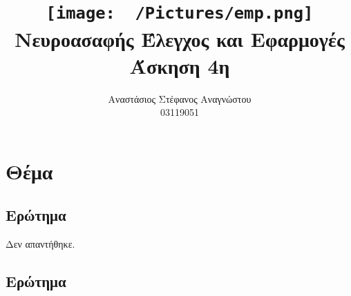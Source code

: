 \documentclass{article}
\title{
    \texttt{[image: ~/Pictures/emp.png]} \\
    \vskip 5cm
    Νευροασαφής Έλεγχος και Εφαρμογές\\
    \large Άσκηση 4η
    \vskip 5cm
}
\author{Αναστάσιος Στέφανος Αναγνώστου\\
        03119051}
\begin{document}
\maketitle
\newpage
\tableofcontents
\newpage

\section{Θέμα}

\subsection{Ερώτημα}

Δεν απαντήθηκε.


\clearpage
\subsection{Ερώτημα}
\end{document}
